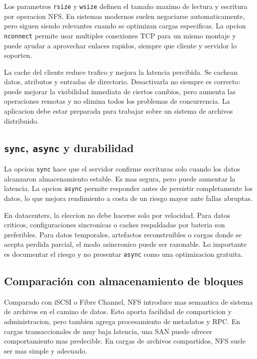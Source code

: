 Los parametros \texttt{rsize} y \texttt{wsize} definen el tamaño maximo de lectura y escritura por operacion NFS. En sistemas modernos suelen negociarse automaticamente, pero siguen siendo relevantes cuando se optimizan cargas especificas. La opcion \texttt{nconnect} permite usar multiples conexiones TCP para un mismo montaje y puede ayudar a aprovechar enlaces rapidos, siempre que cliente y servidor lo soporten.

La cache del cliente reduce trafico y mejora la latencia percibida. Se cachean datos, atributos y entradas de directorio. Desactivarla no siempre es correcto: puede mejorar la visibilidad inmediata de ciertos cambios, pero aumenta las operaciones remotas y no elimina todos los problemas de concurrencia. La aplicacion debe estar preparada para trabajar sobre un sistema de archivos distribuido.

\subsection{\texttt{sync}, \texttt{async} y durabilidad}

La opcion \texttt{sync} hace que el servidor confirme escrituras solo cuando los datos alcanzaron almacenamiento estable. Es mas segura, pero puede aumentar la latencia. La opcion \texttt{async} permite responder antes de persistir completamente los datos, lo que mejora rendimiento a costa de un riesgo mayor ante fallas abruptas.

En datacenters, la eleccion no debe hacerse solo por velocidad. Para datos criticos, configuraciones sincronicas o caches respaldadas por bateria son preferibles. Para datos temporales, artefactos reconstruibles o cargas donde se acepta perdida parcial, el modo asincronico puede ser razonable. Lo importante es documentar el riesgo y no presentar \texttt{async} como una optimizacion gratuita.

\subsection{Comparación con almacenamiento de bloques}

Comparado con iSCSI o Fibre Channel, NFS introduce mas semantica de sistema de archivos en el camino de datos. Esto aporta facilidad de comparticion y administracion, pero tambien agrega procesamiento de metadatos y RPC. En cargas transaccionales de muy baja latencia, una SAN puede ofrecer comportamiento mas predecible. En cargas de archivos compartidos, NFS suele ser mas simple y adecuado.
